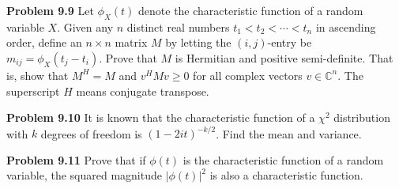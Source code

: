 \textbf{Problem 9.9} Let $\phi_X(t)$ denote the characteristic function of a random variable $X$. Given any $n$ distinct real numbers $t_1<t_2<\cdots<t_n$ in ascending order, define an $n\times n$ matrix $M$ by letting the $(i,j)$-entry be $m_{ij}=\phi_X(t_j-t_i)$. Prove that $M$ is Hermitian and positive semi-definite. That is, show that $M^H=M$ and $v^H Mv\geq 0$ for all complex vectors $v\in\mathbb{C}^n$. The superscript $H$ means conjugate transpose.

\textbf{Problem 9.10} It is known that the characteristic function of a $\chi^2$ distribution with $k$ degrees of freedom is $(1-2it)^{-k/2}$. Find the mean and variance.

\textbf{Problem 9.11} Prove that if $\phi(t)$ is the characteristic function of a random variable, the squared magnitude $\lvert\phi(t)\rvert^2$ is also a characteristic function.

